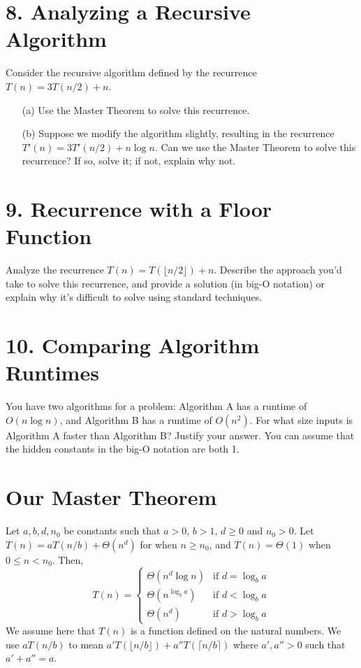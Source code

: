 \documentclass{article}
\begin{document}
\section*{8. Analyzing a Recursive Algorithm}

Consider the recursive algorithm defined by the recurrence $T(n) = 3T(n/2) + n$.

\begin{enumerate}
    \item[(a)] Use the Master Theorem to solve this recurrence.
    \item[(b)]  Suppose we modify the algorithm slightly, resulting in the recurrence $T'(n) = 3T'(n/2) + n\log n$.  Can we use the Master Theorem to solve this recurrence? If so, solve it; if not, explain why not.
\end{enumerate}

\section*{9. Recurrence with a Floor Function}

Analyze the recurrence $T(n) = T(\lfloor n/2 \rfloor) + n$.  Describe the approach you'd take to solve this recurrence, and provide a solution (in big-O notation) or explain why it's difficult to solve using standard techniques.

\section*{10.  Comparing Algorithm Runtimes}

You have two algorithms for a problem: Algorithm A has a runtime of $O(n \log n)$, and Algorithm B has a runtime of $O(n^2)$.  For what size inputs is Algorithm A faster than Algorithm B?  Justify your answer.  You can assume that the hidden constants in the big-O notation are both 1.


\section*{Our Master Theorem}

\begin{theorem}
Let $a, b, d, n_0$ be constants such that $a > 0$, $b > 1$, $d \geq 0$ and $n_0 > 0$. Let $T(n) = aT(n/b) + \Theta(n^d)$ for when $n \geq n_0$, and $T(n) = \Theta(1)$ when $0 \leq n < n_0$. Then,
\[
T(n) = \begin{cases}
\Theta(n^d \log n) & \text{if } d = \log_b a \\
\Theta(n^{\log_b a}) & \text{if } d < \log_b a \\
\Theta(n^d) & \text{if } d > \log_b a
\end{cases}
\]
We assume here that $T(n)$ is a function defined on the natural numbers. We use $aT(n/b)$ to mean $a'T(\lfloor n/b \rfloor) + a''T(\lceil n/b \rceil)$ where $a', a'' > 0$ such that $a' + a'' = a$.
\end{theorem}
\end{document}
